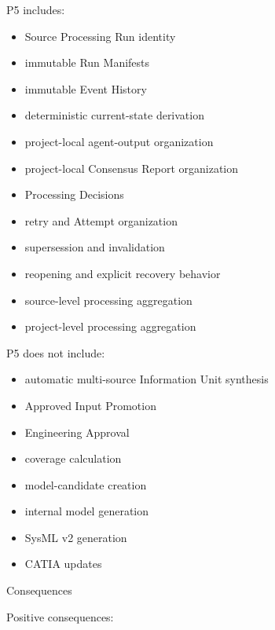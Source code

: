 P5 includes:

\begin{itemize}
\tightlist
\item
  Source Processing Run identity
\item
  immutable Run Manifests
\item
  immutable Event History
\item
  deterministic current-state derivation
\item
  project-local agent-output organization
\item
  project-local Consensus Report organization
\item
  Processing Decisions
\item
  retry and Attempt organization
\item
  supersession and invalidation
\item
  reopening and explicit recovery behavior
\item
  source-level processing aggregation
\item
  project-level processing aggregation
\end{itemize}

P5 does not include:

\begin{itemize}
\tightlist
\item
  automatic multi-source Information Unit synthesis
\item
  Approved Input Promotion
\item
  Engineering Approval
\item
  coverage calculation
\item
  model-candidate creation
\item
  internal model generation
\item
  SysML v2 generation
\item
  CATIA updates
\end{itemize}

Consequences

Positive consequences:

